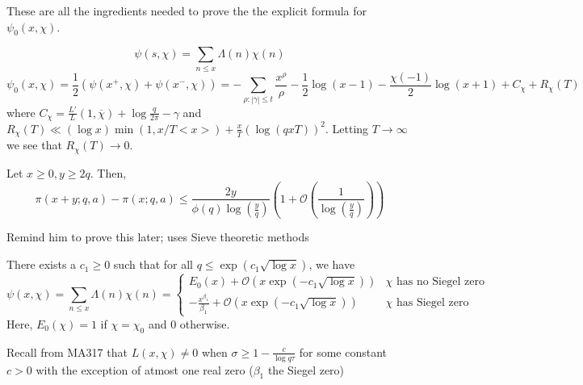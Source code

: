 \documentclass[oneside, 12pt, ]{scrbook}
\theoremstyle{theorem}
\begin{document}
These are all the ingredients needed to prove the the explicit formula for $\psi_{0}(x, \chi)$. 

\begin{theorem}
$$\psi(s,\chi) = \sum_{n \le x} \Lambda(n) \chi(n)$$ $$\psi_{0}(x,\chi)  = \frac{1}{2}(\psi(x^{+}, \chi) + \psi(x^{-}, \chi)) = - \sum_{\rho : |\gamma|\le t} \frac{x^{\rho}}{\rho} - \frac{1}{2} \log (x-1) - \frac{\chi(-1)}{2} \log (x+1) + C_{\chi} + R_{\chi}(T)$$ where $C_{\chi} = \frac{L'}{L} (1, \overline{\chi}) + \log \frac{q}{2 \pi} - \gamma$ and $R_{\chi}(T) \ll (\log x)\min(1, x/T <x>) + \frac{x}{T} (\log (qxT))^2$. Letting $T \rightarrow \infty$ we see that $R_{\chi}(T) \rightarrow 0$.
\end{theorem}

\begin{theorem}
Let $x\geq 0, y \geq 2q$. Then, $$\pi(x+y; q,a) - \pi (x; q,a) \le \frac{2y}{\phi(q) \log (\frac{y}{q})} \left( 1 + \mathcal{O}(\frac{1}{\log (\frac{y}{q})}) \right)$$
\end{theorem}

\textcolor{BrickRed}{Remind him to prove this later; uses Sieve theoretic methods}

\begin{theorem}
There exists a $c_{1} \geq 0$ such that for all $q \le \exp (c_{1} \sqrt{\log x})$, we have $$\psi(x, \chi) = \sum_{n \le x}\Lambda (n) \chi (n) = \begin{cases} E_{0}(x) + \mathcal{O} (x\exp(-c_{1}\sqrt{\log x})) & \chi \text{ has no Siegel zero} \\ -\frac{x^{\beta_{1}}}{\beta_{1}} + \mathcal{O} (x\exp(-c_{1}\sqrt{\log x})) & \chi \text{ has Siegel zero} \end{cases}$$ Here, $E_{0}(\chi) = 1$ if $\chi = \chi_{0}$ and $0$ otherwise. 
\end{theorem}

Recall from MA317 that $L(x,\chi) \neq 0$ when $\sigma \geq  1 - \frac{c}{\log q\tau}$ for some constant $c>0$ with the exception of atmost one real zero ($\beta_{1}$ the Siegel zero)
\end{document}
